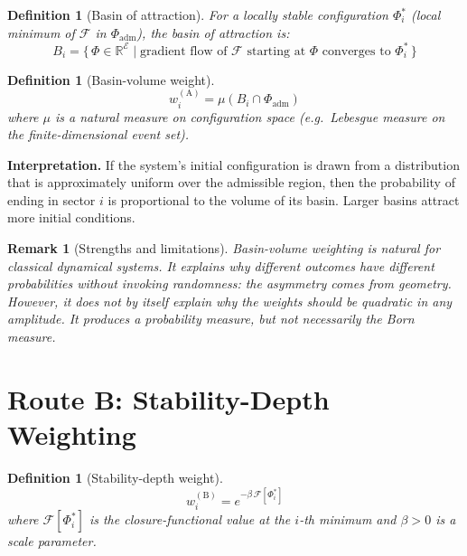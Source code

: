 \documentclass[12pt]{article}
\newtheorem{definition}[theorem]{Definition}
\newtheorem{remark}[theorem]{Remark}
\newcommand{\Ecal}{\mathcal{E}}
\newcommand{\Fcal}{\mathcal{F}}
\begin{document}
\begin{definition}[Basin of attraction]\label{def:basin}
For a locally stable configuration $\Phi_i^*$ (local minimum of $\Fcal$ in $\Phi_{\mathrm{adm}}$), the \textit{basin of attraction} is:
\begin{equation}
    B_i = \bigl\{\, \Phi \in \mathbb{R}^\Ecal \;\big|\; \text{gradient flow of } \Fcal \text{ starting at } \Phi \text{ converges to } \Phi_i^* \,\bigr\}
\end{equation}
\end{definition}

\begin{definition}[Basin-volume weight]\label{def:basin_weight}
\begin{equation}\label{eq:basin_weight}
    w_i^{(\mathrm{A})} = \mu(B_i \cap \Phi_{\mathrm{adm}})
\end{equation}
where $\mu$ is a natural measure on configuration space (e.g.\ Lebesgue measure on the finite-dimensional event set).
\end{definition}

\textbf{Interpretation.} If the system's initial configuration is drawn from a distribution that is approximately uniform over the admissible region, then the probability of ending in sector $i$ is proportional to the volume of its basin. Larger basins attract more initial conditions.

\begin{remark}[Strengths and limitations]
Basin-volume weighting is natural for classical dynamical systems. It explains why different outcomes have different probabilities without invoking randomness: the asymmetry comes from geometry. However, it does not by itself explain why the weights should be \textit{quadratic} in any amplitude. It produces a probability measure, but not necessarily the Born measure.
\end{remark}

\section{Route B: Stability-Depth Weighting}\label{sec:stability}

\begin{definition}[Stability-depth weight]\label{def:stability_weight}
\begin{equation}\label{eq:stability_weight}
    w_i^{(\mathrm{B})} = e^{-\beta\, \Fcal[\Phi_i^*]}
\end{equation}
where $\Fcal[\Phi_i^*]$ is the closure-functional value at the $i$-th minimum and $\beta > 0$ is a scale parameter.
\end{definition}
\end{document}
